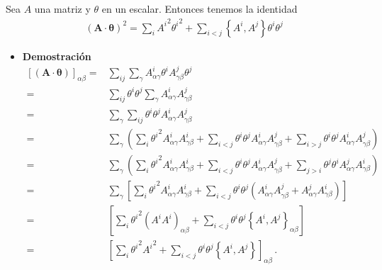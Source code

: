 \begin{frame}
Sea $A$ una matriz y $\theta$ en un escalar. Entonces tenemos la identidad
\begin{align}
  \label{eq:206qftw}
  (\mathbf{A}\cdot\boldsymbol{\theta})^2=\sum_i {A^i}^2 {\theta^i}^2+\sum_{i\lt j}\left\{A^i,A^j  \right\}\theta^i \theta^j 
\end{align}
\end{frame}
\begin{itemize}
\item \textbf{Demostración}
  \begin{align}
    \left[\left(\mathbf{A}\cdot\boldsymbol{\theta}\right)\right]_{\alpha\beta}
    =&\sum_{i j}\sum_\gamma A^i_{\alpha\gamma}\theta^iA^j_{\gamma\beta}\theta^j\nonumber\\    
    =&\sum_{i j}\theta^i\theta^j\sum_\gamma A^i_{\alpha\gamma}A^j_{\gamma\beta}\nonumber\\    
    =&\sum_\gamma \sum_{i j}\theta^i\theta^jA^i_{\alpha\gamma}A^j_{\gamma\beta}\nonumber\\    
    =&\sum_\gamma \left(\sum_{i}{\theta^i}^2A^i_{\alpha\gamma}A^i_{\gamma\beta}+\sum_{i<j}\theta^i\theta^jA^i_{\alpha\gamma}A^j_{\gamma\beta}+\sum_{i>j}\theta^i\theta^jA^i_{\alpha\gamma}A^j_{\gamma\beta}\right)\nonumber\\    
    =&\sum_\gamma \left(\sum_{i}{\theta^i}^2A^i_{\alpha\gamma}A^i_{\gamma\beta}+\sum_{i<j}\theta^i\theta^jA^i_{\alpha\gamma}A^j_{\gamma\beta}+\sum_{j>i}\theta^j\theta^iA^j_{\alpha\gamma}A^i_{\gamma\beta}\right)\nonumber\\    
    =&\sum_\gamma \left[\sum_{i}{\theta^i}^2A^i_{\alpha\gamma}A^i_{\gamma\beta}+\sum_{i<j}\theta^i\theta^j\left(A^i_{\alpha\gamma}A^j_{\gamma\beta}+A^j_{\alpha\gamma}A^i_{\gamma\beta}\right)\right]\nonumber\\    
    =&\left[\sum_{i}{\theta^i}^2\left(A^iA^i\right)_{\alpha\beta}+\sum_{i<j}\theta^i\theta^j\left\{ A^i,A^j\right\}_{\alpha\beta}\right]\nonumber\\    
    =&\left[\sum_{i}{\theta^i}^2{A^i}^2+\sum_{i<j}\theta^i\theta^j\left\{ A^i,A^j\right\}\right]_{\alpha\beta}\,.
  \end{align}

\end{itemize}

